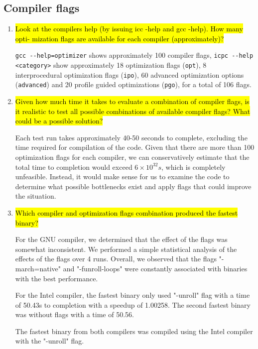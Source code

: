 \documentclass{article}
\begin{document}
\subsection{Compiler flags}
\begin{enumerate}
	\item \hl{Look at the compilers help (by issuing icc -help and gcc -help). How many opti-
	mization flags are available for each compiler (approximately)?}

	\verb!gcc --help=optimizer! shows approximately 100 compiler flags, \verb!icpc --help <category>! show approximately 18 optimization flags (\verb!opt!), 8 interprocedural optimization flags (\verb!ipo!), 60 advanced optimization options (\verb!advanced!) and 20 profile guided optimizations (\verb!pgo!), for a total of 106 flags.

	\item \hl{Given how much time it takes to evaluate a combination of compiler flags, is it realistic to test all possible combinations of available compiler flags? What could be a possible solution?}

	Each test run takes approximately 40-50 seconds to complete, excluding the time required for compilation of the code. Given that there are more than 100 optimization flags for each compiler, we can conservatively estimate that the total time to completion would exceed $6\times10^{32}s$, which is completely unfeasible. Instead, it would make sense for us to examine the code to determine what possible bottlenecks exist and apply flags that could improve the situation.

	\item \hl{Which compiler and optimization flags combination produced the fastest binary?}

	For the GNU compiler, we determined that the effect of the flags was somewhat inconsistent. We performed a simple statistical analysis of the effects of the flags over 4 runs. Overall, we observed that the flags "-march=native" and "-funroll-loops" were constantly associated with binaries with the best performance.

	For the Intel compiler, the fastest binary only used "-unroll" flag with a time of 50.43s to completion with a speedup of 1.00258. The second fastest binary was without flags with a time of 50.56.

	The fastest binary from both compilers was compiled using the Intel compiler with the "-unroll" flag.
\end{enumerate}
\end{document}
